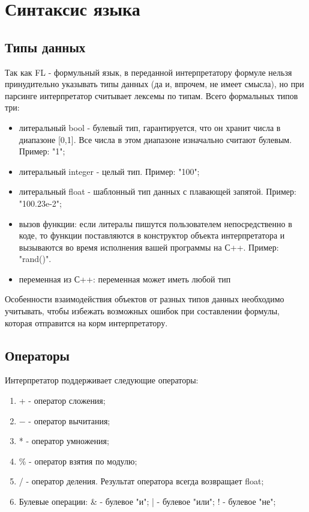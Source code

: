 \documentclass[../Language-declaration.tex]{subfiles}
\begin{document}
    \chapter{Синтаксис языка}
        \section{Типы данных}
            Так как FL - формульный язык, в переданной интерпретатору формуле нельзя принудительно указывать типы данных (да и, впрочем, не имеет смысла), но при парсинге интерпретатор считывает лексемы по типам. Всего формальных типов три:
            \begin{itemize}
             \item литеральный bool - булевый тип, гарантируется, что он хранит числа в диапазоне [0,1]. Все числа в этом диапазоне изначально считают булевым. Пример: "1";
             \item литеральный integer - целый тип. Пример: "100";
             \item литеральный float - шаблонный тип данных с плавающей запятой. Пример: "100.23e-2";
             \item вызов функции: если литералы пишутся пользователем непосредственно в коде, то функции поставляются в конструктор объекта интерпретатора и вызываются во время исполнения вашей программы на С++. Пример: "rand()".
             \item переменная из С++: переменная может иметь любой тип
            \end{itemize}

            Особенности взаимодействия объектов от разных типов данных необходимо учитывать, чтобы избежать возможных ошибок при составлении формулы, которая отправится на корм интерпретатору.

        \section{Операторы}
            Интерпретатор поддерживает следующие операторы:
        \begin{enumerate}
         \item + - оператор сложения;
         \item $-$ - оператор вычитания;
         \item * - оператор умножения;
         \item \% - оператор взятия по модулю;
         \item / - оператор деления. Результат оператора всегда возвращает float;
         \item Булевые операции:
            \subitem \& - булевое "и";
            \subitem | - булевое "или";
            \subitem ! - булевое "не";
        \end{enumerate}
\end{document}

